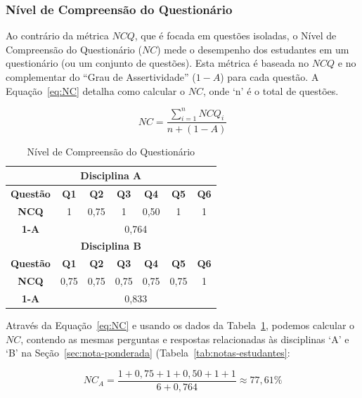 \subsubsection{Nível de Compreensão do Questionário}\label{sec:NC}

Ao contrário da métrica $NCQ$, que é focada em questões isoladas, o Nível de Compreensão do Questionário ($NC$) mede o desempenho dos estudantes em um questionário (ou um conjunto de questões). Esta métrica é baseada no \textbf{$NCQ$} e no complementar do ``Grau de Assertividade'' ($1-A$) para cada questão. A Equação~\ref{eq:NC} detalha como calcular o $NC$, onde `n' é o total de questões.

\begin{equation}
\label{eq:NC}
NC = \frac{\sum_{i=1}^{n}NCQ_i}{n + (1 - A)}
\end{equation}

\begin{table}[htbp]
\caption{Nível de Compreensão do Questionário}
\centering
\begin{adjustbox}{center, width=\columnwidth-16pt}
\begin{tabular}{|c|c|c|c|c|c|c|}
\hline
\multicolumn{7}{|c|}{\textbf{Disciplina A}} \\ \hline
\textbf{Questão} & \textbf{Q1} & \textbf{Q2} & \textbf{Q3} & \textbf{Q4} & \textbf{Q5} & \textbf{Q6} \\ \hline
\textbf{NCQ} & 1 & 0,75 & 1 & 0,50 & 1 & 1 \\ \hline
\textbf{1-A} & \multicolumn{6}{c|}{0,764} \\ \hline
\multicolumn{7}{|c|}{\textbf{Disciplina B}} \\ \hline
\textbf{Questão} & \textbf{Q1} & \textbf{Q2} & \textbf{Q3} & \textbf{Q4} & \textbf{Q5} & \textbf{Q6} \\ \hline
\textbf{NCQ} & 0,75 & 0,75 & 0,75 & 0,75 & 0,75 & 1 \\ \hline
\textbf{1-A} & \multicolumn{6}{c|}{0,833} \\ \hline
\end{tabular}
\end{adjustbox}
\label{tab:NC}
\end{table}

Através da Equação~\ref{eq:NC} e usando os dados da Tabela~\ref{tab:NC}, podemos calcular o $NC$, contendo as mesmas perguntas e respostas relacionadas às disciplinas `A' e `B' na Seção~\ref{sec:nota-ponderada} (Tabela~\ref{tab:notas-estudantes}:

$$NC_A = \frac{1 + 0,75 + 1 + 0,50 + 1 + 1}{6 + 0,764} \approx 77,61\% $$

